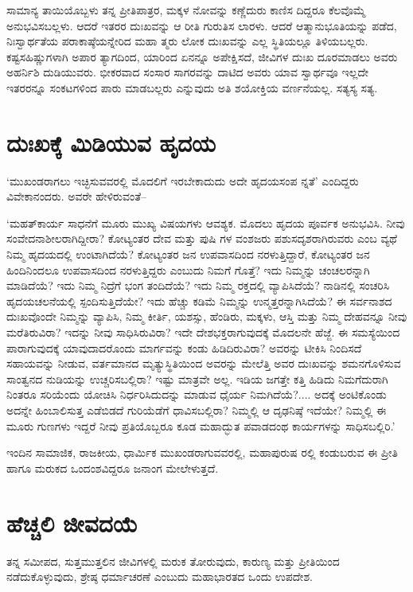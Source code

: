 ಸಾಮಾನ್ಯ ತಾಯಿಯೊಬ್ಬಳು ತನ್ನ ಪ್ರೀತಿಪಾತ್ರರ, ಮಕ್ಕಳ ನೋವನ್ನು ಕಣ್ಣೆದುರು ಕಾಣಿಸ ದಿದ್ದರೂ ಕೆಲವೊಮ್ಮೆ ಅನುಭವಿಸಬಲ್ಲಳು. ಆದರೆ ಇತರರ ದುಃಖವನ್ನು ಆ ರೀತಿ ಗುರುತಿಸ ಲಾರಳು. ಆದರೆ ಆತ್ಮಾನುಭೂತಿಯನ್ನು ಪಡೆದ, ನಿಃಸ್ವಾರ್ಥತೆಯ ಪರಾಕಾಷ್ಠೆಯನ್ನೇರಿದ ಮಹಾ ತ್ಮರು ಲೋಕ ದುಃಖವನ್ನು ಎಲ್ಲ ಸ್ಥಿತಿಯಲ್ಲೂ ತಿಳಿಯಬಲ್ಲರು. ಕಷ್ಟಸಹಿಷ್ಣುಗಳಾಗಿ ಅಪಾರ ತ್ಯಾಗದಿಂದ, ಯಾರಿಂದ ಏನನ್ನೂ ಅಪೇಕ್ಷಿಸದೆ, ಜೀವಿಗಳ ದುಃಖ ದೂರಮಾಡಲು ಅವರು ಅಹರ್ನಿಶಿ ದುಡಿಯುವರು. ಭೀಕರವಾದ ಸಂಸಾರ ಸಾಗರವನ್ನು ದಾಟಿದ ಅವರು ಯಾವ ಸ್ವಾರ್ಥವೂ ಇಲ್ಲದೇ ಇತರರನ್ನೂ ಸಂಕಟಗಳಿಂದ ಪಾರು ಮಾಡಬಲ್ಲರು ಎನ್ನುವುದು ಅತಿ ಶಯೋಕ್ತಿಯ ವರ್ಣನೆಯಲ್ಲ. ಸತ್ಯಸ್ಯ ಸತ್ಯ.


\section{ದುಃಖಕ್ಕೆ ಮಿಡಿಯುವ ಹೃದಯ}

‘ಮುಖಂಡರಾಗಲು ಇಚ್ಛಿಸುವವರಲ್ಲಿ ಮೊದಲಿಗೆ ಇರಬೇಕಾದುದು ಅದೇ ಹೃದಯಸಂಪ ನ್ನತೆ’ ಎಂದಿದ್ದರು ವಿವೇಕಾನಂದರು. ಅವರೇ ಹೇಳಿರುವಂತೆ–

‘ಮಹತ್​ಕಾರ್ಯ ಸಾಧನೆಗೆ ಮೂರು ಮುಖ್ಯ ವಿಷಯಗಳು ಆವಶ್ಯಕ. ಮೊದಲು ಹೃದಯ ಪೂರ್ವಕ ಅನುಭವಿಸಿ. ನೀವು ಸಂವೇದನಾಶೀಲರಾಗಿದ್ದೀರಾ? ಕೋಟ್ಯಂತರ ದೇವ ಮತ್ತು ಪುಷಿ ಗಳ ವಂಶಜರು ಪಶುಸದೃಶರಾಗಿರುವರು ಎಂಬ ವ್ಯಥೆ ನಿಮ್ಮ ಹೃದಯದಲ್ಲಿ ಉಂಟಾಗಿದೆಯೆ? ಕೋಟ್ಯಂತರ ಜನ ಉಪವಾಸದಿಂದ ನರಳುತ್ತಿದ್ದಾರೆ, ಕೋಟ್ಯಂತರ ಜನ ಹಿಂದಿನಿಂದಲೂ ಉಪವಾಸದಿಂದ ನರಳುತ್ತಿದ್ದರು ಎಂಬುದು ನಿಮಗೆ ಗೊತ್ತೆ? ಇದು ನಿಮ್ಮನ್ನು ಚಂಚಲರನ್ನಾಗಿ ಮಾಡಿದೆಯೆ? ಇದು ನಿಮ್ಮ ನಿದ್ರೆಗೆ ಭಂಗ ತಂದಿದೆಯೆ? ಇದು ನಿಮ್ಮ ರಕ್ತದಲ್ಲಿ ವ್ಯಾಪಿಸಿದೆಯೆ? ನಾಡಿನಲ್ಲಿ ಸಂಚರಿಸಿ ಹೃದಯಚಲನೆಯಲ್ಲಿ ಸ್ಪಂದಿಸುತ್ತಿದೆಯೇ? ಇದು ಹೆಚ್ಚು ಕಡಿಮೆ ನಿಮ್ಮನ್ನು ಉನ್ಮತ್ತರನ್ನಾಗಿಸಿದೆಯೆ? ಈ ಸರ್ವನಾಶದ ದುಃಖವೊಂದೇ ನಿಮ್ಮನ್ನು ವ್ಯಾಪಿಸಿ, ನಿಮ್ಮ ಕೀರ್ತಿ, ಯಶಸ್ಸು, ಹೆಂಡಿರು, ಮಕ್ಕಳು, ಆಸ್ತಿ ಮತ್ತು ನಿಮ್ಮ ದೇಹವನ್ನೂ ನೀವು ಮರೆತಿರುವಿರಾ? ಇದನ್ನು ನೀವು ಸಾಧಿಸಿರುವಿರಾ? ಇದೇ ದೇಶಭಕ್ತರಾಗುವುದಕ್ಕೆ ಮೊದಲನೇ ಹೆಜ್ಜೆ. ಈ ಸಮಸ್ಯೆಯಿಂದ ಪಾರಾಗುವುದಕ್ಕೆ ಯಾವುದಾದರೊಂದು ಮಾರ್ಗವನ್ನು ಕಂಡು ಹಿಡಿದಿರುವಿರಾ? ಅವರನ್ನು ಟೀಕಿಸಿ ನಿಂದಿಸದೆ ಸಹಾಯವನ್ನು ನೀಡುವ, ವರ್ತಮಾನದ ಮೃತ್ಯುಸ್ಥಿತಿಯಿಂದ ಅವರನ್ನು ಮೇಲೆತ್ತಿ ಅವರ ದುಃಖವನ್ನು ಶಮನಗೊಳಿಸುವ ಸಾಂತ್ವನದ ನುಡಿಯನ್ನು ಉಚ್ಚರಿಸಬಲ್ಲಿರಾ? ಇಷ್ಟು ಮಾತ್ರವೇ ಅಲ್ಲ. ಇಡಿಯ ಜಗತ್ತೇ ಕತ್ತಿ ಹಿಡಿದು ನಿಮಗೆದುರಾಗಿ ನಿಂತರೂ ಸರಿಯೆಂದು ಯೋಚಿಸಿ ನಿರ್ಧರಿಸಿದುದನ್ನು ಮಾಡುವ ಧೈರ್ಯ ನಿಮಗಿದೆಯೆ?.... ಅದಕ್ಕೆ ಅಂಟಿಕೊಂಡು ಅದನ್ನೇ ಹಿಂಬಾಲಿಸುತ್ತ ಎಡೆಬಿಡದೆ ಗುರಿಯೆಡೆಗೆ ಧಾವಿಸಬಲ್ಲಿರಾ? ನಿಮ್ಮಲ್ಲಿ ಆ ದೃಢನಿಷ್ಠೆ ಇದೆಯೇ? ನಿಮ್ಮಲ್ಲಿ ಈ ಮೂರು ಗುಣಗಳು ಇದ್ದರೆ ನೀವು ಪ್ರತಿಯೊಬ್ಬರೂ ಕೂಡ ಮಹಾದ್ಭುತ ಪವಾಡದಂಥ ಕಾರ್ಯಗಳನ್ನು ಸಾಧಿಸಬಲ್ಲಿರಿ.’

ಇಂದಿನ ಸಾಮಾಜಿಕ, ರಾಜಕೀಯ, ಧಾರ್ಮಿಕ ಮುಖಂಡರಾಗುವವರಲ್ಲಿ, ಮಹಾಪುರುಷ ರಲ್ಲಿ ಕಂಡುಬರುವ ಈ ಪ್ರೀತಿ ಹಾಗೂ ಮರುಕದ ಒಂದಂಶವಿದ್ದರೂ ಜನಾಂಗ ಮೇಲೇಳುತ್ತದೆ.


\section{ಹೆಚ್ಚಲಿ ಜೀವದಯೆ}

ತನ್ನ ಸಮೀಪದ, ಸುತ್ತಮುತ್ತಲಿನ ಜೀವಿಗಳಲ್ಲಿ ಮರುಕ ತೋರುವುದು, ಕಾರುಣ್ಯ ಮತ್ತು ಪ್ರೀತಿಯಿಂದ ನಡೆದುಕೊಳ್ಳುವುದು, ಶ್ರೇಷ್ಠ ಧರ್ಮಾಚರಣೆ ಎಂಬುದು ಮಹಾಭಾರತದ ಒಂದು ಉಪದೇಶ.

